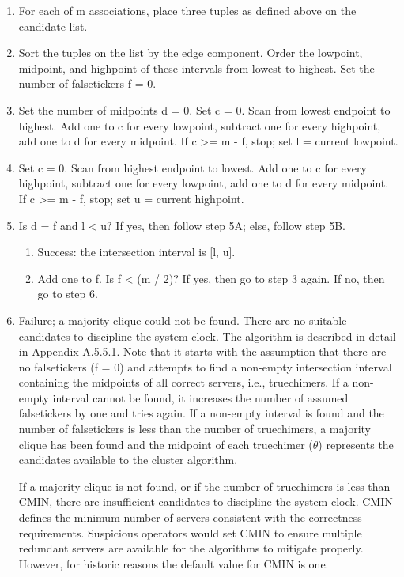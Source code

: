 \begin{enumerate}
  \item For each of m associations, place three tuples as defined above
    on the candidate list.

  \item Sort the tuples on the list by the edge component.  Order the
    lowpoint, midpoint, and highpoint of these intervals from lowest to
    highest.  Set the number of falsetickers f = 0.

  \item Set the number of midpoints d = 0.  Set c = 0.  Scan from lowest
    endpoint to highest.  Add one to c for every lowpoint, subtract one
    for every highpoint, add one to d for every midpoint.  If c >= m - f,
    stop; set l = current lowpoint.

  \item Set c = 0.  Scan from highest endpoint to lowest.  Add one to c
    for every highpoint, subtract one for every lowpoint, add one to d
    for every midpoint.  If c >= m - f, stop; set u = current highpoint.

  \item Is d = f and l < u?  If yes, then follow step 5A; else, follow
    step 5B.

    \begin{enumerate}[5A.]
      \item Success: the intersection interval is [l, u].

      \item Add one to f.  Is f < (m / 2)?  If yes, then go to step 3 again.
        If no, then go to step 6.
    \end{enumerate}

  \item Failure; a majority clique could not be found.  There are no
    suitable candidates to discipline the system clock.
    The algorithm is described in detail in Appendix A.5.5.1.  Note that
    it starts with the assumption that there are no falsetickers (f = 0)
    and attempts to find a non-empty intersection interval containing the
    midpoints of all correct servers, i.e., truechimers.  If a non-empty
    interval cannot be found, it increases the number of assumed
    falsetickers by one and tries again.  If a non-empty interval is
    found and the number of falsetickers is less than the number of
    truechimers, a majority clique has been found and the midpoint of
    each truechimer ($ \theta $) represents the candidates available to the
    cluster algorithm.

    If a majority clique is not found, or if the number of truechimers is
    less than CMIN, there are insufficient candidates to discipline the
    system clock.  CMIN defines the minimum number of servers consistent
    with the correctness requirements.  Suspicious operators would set
    CMIN to ensure multiple redundant servers are available for the
    algorithms to mitigate properly.  However, for historic reasons the
    default value for CMIN is one.
\end{enumerate}

